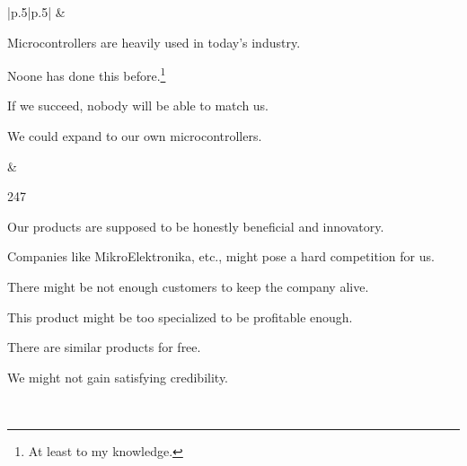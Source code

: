 \documentclass[a4paper,twoside,15pt]{book}
\begin{document}
\begin{table}[h!]
\begin{tabular}{|p{}|p{}|}
					&  \\

				\begin{dinglist}{73}
					\setlength{\itemsep}{-3pt}
					\item Microcontrollers are heavily used in today's industry.
					\item Noone has done this before.\footnote{At least to my knowledge.}
					\item If we succeed, nobody will be able to match us.
					\item We could expand to our own microcontrollers.
				\end{dinglist}	&

				\begin{dinglist}{247}
					\setlength{\itemsep}{-3pt}
					\item Our products are supposed to be honestly beneficial and innovatory.
					\item Companies like MikroElektronika, etc., might pose a hard competition for us.
					\item There might be not enough customers to keep the company alive.
					\item This product might be too specialized to be profitable enough.
					\item There are similar products for free.
					\item We might not gain satisfying credibility.
				\end{dinglist}	\\
				\hline
			\end{tabular}
			\caption{SWOT analysis}
		\end{table}
		\pagebreak
\end{document}
